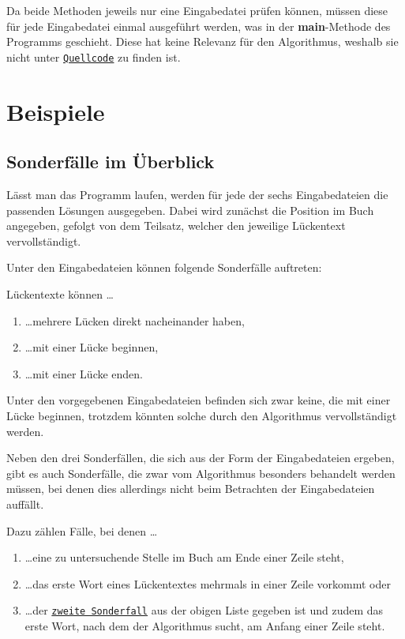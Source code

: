 \documentclass[a4paper, 10pt, ngerman]{scrartcl}
\begin{document}
Da beide Methoden jeweils nur eine Eingabedatei prüfen können,
müssen diese für jede Eingabedatei einmal ausgeführt werden,
was in der \textbf{main}-Methode des Programms geschieht.
Diese hat keine Relevanz für den Algorithmus,
weshalb sie nicht unter \hyperref[sec:quellcode]{\texttt{Quellcode}} zu finden ist.


\section{Beispiele}\label{sec:beispiele}
\subsection{Sonderfälle im Überblick}\label{ueberblickSondefaelle}
Lässt man das Programm laufen,
werden für jede der sechs Eingabedateien die passenden Lösungen ausgegeben.
Dabei wird zunächst die Position im Buch angegeben,
gefolgt von dem Teilsatz,
welcher den jeweilige Lückentext vervollständigt.

Unter den Eingabedateien können folgende Sonderfälle auftreten:

Lückentexte können \ldots

\begin{enumerate}
	\item \ldots mehrere Lücken direkt nacheinander haben,\label{sonderfallEins}
	\item \ldots mit einer Lücke beginnen,\label{sonderfallZwei}
	\item \ldots mit einer Lücke enden.\label{sonderfallDrei}
    \setcounter{enumTemp}{\theenumi}
\end{enumerate}

Unter den vorgegebenen Eingabedateien befinden sich zwar keine,
die mit einer Lücke beginnen,
trotzdem könnten solche durch den Algorithmus vervollständigt werden.

Neben den drei Sonderfällen,
die sich aus der Form der Eingabedateien ergeben,
gibt es auch Sonderfälle,
die zwar vom Algorithmus besonders behandelt werden müssen,
bei denen dies allerdings nicht beim Betrachten der Eingabedateien auffällt.

Dazu zählen Fälle,
bei denen \ldots

\begin{enumerate}
	\setcounter{enumi}{\theenumTemp}
	\item \ldots eine zu untersuchende Stelle im Buch am Ende einer Zeile steht,\label{sonderfallVier}
	\item \ldots das erste Wort eines Lückentextes mehrmals in einer Zeile vorkommt oder\label{sonderfallFuenf}
	\item \ldots der \hyperref[sonderfallZwei]{\texttt{zweite Sonderfall}} aus der obigen Liste gegeben ist
	und zudem das erste Wort,
	nach dem der Algorithmus sucht,
	am Anfang einer Zeile steht.\label{sonderfallSechs}
\end{enumerate}
\end{document}
